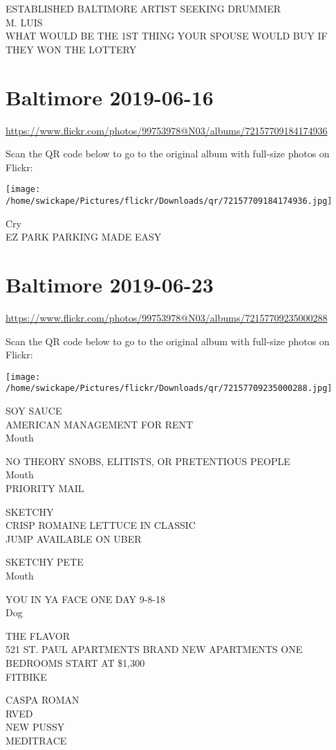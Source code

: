 \documentclass[10pt,letterpaper]{article}
\begin{document}
ESTABLISHED BALTIMORE ARTIST SEEKING DRUMMER\\
M. LUIS\\
WHAT WOULD BE THE 1ST THING YOUR SPOUSE WOULD BUY IF THEY WON THE LOTTERY


\section*{Baltimore 2019-06-16}

\url{https://www.flickr.com/photos/99753978@N03/albums/72157709184174936}

Scan the QR code below to go to the original album with full-size photos on Flickr:

\texttt{[image: /home/swickape/Pictures/flickr/Downloads/qr/72157709184174936.jpg]}


Cry\\
EZ PARK PARKING MADE EASY


\section*{Baltimore 2019-06-23}

\url{https://www.flickr.com/photos/99753978@N03/albums/72157709235000288}

Scan the QR code below to go to the original album with full-size photos on Flickr:

\texttt{[image: /home/swickape/Pictures/flickr/Downloads/qr/72157709235000288.jpg]}


SOY SAUCE\\
AMERICAN MANAGEMENT FOR RENT\\
Mouth

NO THEORY SNOBS, ELITISTS, OR PRETENTIOUS PEOPLE\\
Mouth\\
PRIORITY MAIL

SKETCHY\\
CRISP ROMAINE LETTUCE IN CLASSIC\\
JUMP AVAILABLE ON UBER

SKETCHY PETE\\
Mouth

YOU IN YA FACE ONE DAY 9{-}8{-}18\\
Dog

THE FLAVOR\\
521 ST. PAUL APARTMENTS BRAND NEW APARTMENTS ONE BEDROOMS START AT \$1,300\\
FITBIKE

CASPA ROMAN\\
RVED\\
NEW PUSSY\\
MEDITRACE
\end{document}
